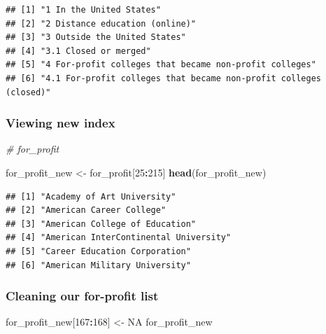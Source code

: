 \documentclass[
]{article}
\newenvironment{Shaded}{\begin{snugshade}}{\end{snugshade}}
\newcommand{\CommentTok}[1]{\textcolor[rgb]{0.56,0.35,0.01}{\textit{#1}}}
\newcommand{\DecValTok}[1]{\textcolor[rgb]{0.00,0.00,0.81}{#1}}
\newcommand{\KeywordTok}[1]{\textcolor[rgb]{0.13,0.29,0.53}{\textbf{#1}}}
\newcommand{\NormalTok}[1]{#1}
\newcommand{\OperatorTok}[1]{\textcolor[rgb]{0.81,0.36,0.00}{\textbf{#1}}}
\newcommand{\OtherTok}[1]{\textcolor[rgb]{0.56,0.35,0.01}{#1}}
\newcommand{\StringTok}[1]{\textcolor[rgb]{0.31,0.60,0.02}{#1}}
\begin{document}
\begin{verbatim}
## [1] "1 In the United States"                                          
## [2] "2 Distance education (online)"                                   
## [3] "3 Outside the United States"                                     
## [4] "3.1 Closed or merged"                                            
## [5] "4 For-profit colleges that became non-profit colleges"           
## [6] "4.1 For-profit colleges that became non-profit colleges (closed)"
\end{verbatim}

\hypertarget{viewing-new-index}{%
\subsubsection{Viewing new index}\label{viewing-new-index}}

\begin{Shaded}
\begin{Highlighting}[]
\CommentTok{# for_profit}
\end{Highlighting}
\end{Shaded}

\begin{Shaded}
\begin{Highlighting}[]
\NormalTok{for_profit_new <-}\StringTok{ }\NormalTok{for_profit[}\DecValTok{25}\OperatorTok{:}\DecValTok{215}\NormalTok{]}
\KeywordTok{head}\NormalTok{(for_profit_new)}
\end{Highlighting}
\end{Shaded}

\begin{verbatim}
## [1] "Academy of Art University"           
## [2] "American Career College"             
## [3] "American College of Education"       
## [4] "American InterContinental University"
## [5] "Career Education Corporation"        
## [6] "American Military University"
\end{verbatim}

\hypertarget{cleaning-our-for-profit-list}{%
\subsubsection{Cleaning our for-profit
list}\label{cleaning-our-for-profit-list}}

\begin{Shaded}
\begin{Highlighting}[]
\NormalTok{for_profit_new[}\DecValTok{167}\OperatorTok{:}\DecValTok{168}\NormalTok{] <-}\StringTok{ }\OtherTok{NA}
\NormalTok{for_profit_new}
\end{Highlighting}
\end{Shaded}
\end{document}

